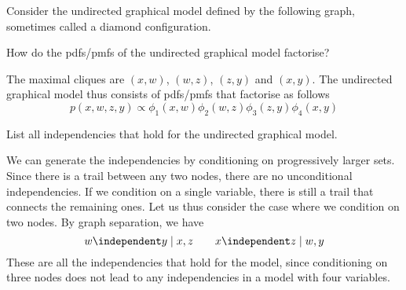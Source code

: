 \label{ex:factorisation-independencies-diamond}

Consider the undirected graphical model defined by the following graph, sometimes called a diamond configuration.

\begin{center}
\end{center}

\begin{exenumerate}

\item How do the pdfs/pmfs of the undirected graphical model factorise?

  \begin{solution}
    The maximal cliques are $(x, w)$, $(w, z)$, $(z, y)$ and $(x,
    y)$. The undirected graphical model thus consists of pdfs/pmfs
    that factorise as follows
    \begin{equation}
      p(x, w, z, y) \propto \phi_1(x,w) \phi_2(w,z) \phi_3(z,y) \phi_4(x,y)
    \end{equation}
    
  \end{solution}

\item List all independencies that hold for the undirected graphical model.

  \begin{solution}
    We can generate the independencies by conditioning on
    progressively larger sets. Since there is a trail between any two
    nodes, there are no unconditional independencies. If we condition
    on a single variable, there is still a trail that connects the
    remaining ones. Let us thus consider the case where we condition
    on two nodes. By graph separation, we have
    \begin{equation}
      w \independent y \mid x,z \quad \quad x \independent z \mid w,y
    \end{equation}
    These are all the independencies that hold for the model, since
    conditioning on three nodes does not lead to any independencies in
    a model with four variables.
  \end{solution}
      

\end{exenumerate}
  

